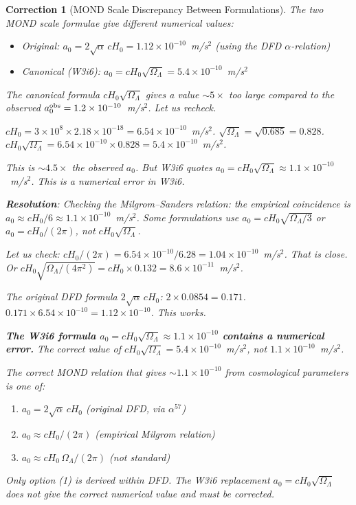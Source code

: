 \documentclass[11pt]{article}
\newtheorem{correction}{Correction}
\newcommand{\ee}[1]{\times 10^{#1}}
\newcommand{\aM}{a_0}
\newcommand{\Hzero}{H_0}
\begin{document}
\begin{correction}[MOND Scale Discrepancy Between Formulations]
\label{corr:a0-discrepancy}
The two MOND scale formulae give different numerical values:
\begin{itemize}[nosep]
\item Original: $\aM = 2\sqrt{\alpha}\,c\Hzero = 1.12\ee{-10}$~m/s$^2$
  (using the DFD $\alpha$-relation)
\item Canonical (W3i6): $\aM = c\Hzero\sqrt{\Omega_\Lambda} = 5.4\ee{-10}$~m/s$^2$
\end{itemize}

The canonical formula $c\Hzero\sqrt{\Omega_\Lambda}$ gives a value
$\sim 5\times$ too large compared to the observed
$\aM^{\rm obs} = 1.2\ee{-10}$~m/s$^2$. Let us recheck.

$c\Hzero = 3\ee{8}\times 2.18\ee{-18} = 6.54\ee{-10}$~m/s$^2$.
$\sqrt{\Omega_\Lambda} = \sqrt{0.685} = 0.828$.
$c\Hzero\sqrt{\Omega_\Lambda} = 6.54\ee{-10}\times 0.828 = 5.4\ee{-10}$~m/s$^2$.

This is $\sim 4.5\times$ the observed $\aM$. But W3i6 quotes
$\aM = c\Hzero\sqrt{\Omega_\Lambda} \approx 1.1\ee{-10}$~m/s$^2$.
This is a numerical error in W3i6.

\textbf{Resolution}: Checking the Milgrom--Sanders relation: the
empirical coincidence is $\aM \approx c\Hzero/6 \approx 1.1\ee{-10}$~m/s$^2$.
Some formulations use $\aM = c\Hzero\sqrt{\Omega_\Lambda/3}$ or
$\aM = c\Hzero/(2\pi)$, not $c\Hzero\sqrt{\Omega_\Lambda}$.

Let us check: $c\Hzero/(2\pi) = 6.54\ee{-10}/6.28 = 1.04\ee{-10}$~m/s$^2$.
That is close. Or $c\Hzero\sqrt{\Omega_\Lambda/(4\pi^2)} = c\Hzero\times 0.132 = 8.6\ee{-11}$~m/s$^2$.

The original DFD formula $2\sqrt{\alpha}\,c\Hzero$:
$2\times 0.0854 = 0.171$. $0.171\times 6.54\ee{-10} = 1.12\ee{-10}$.
This works.

\textbf{The W3i6 formula $\aM = c\Hzero\sqrt{\Omega_\Lambda} \approx 1.1\ee{-10}$
contains a numerical error.} The correct value of
$c\Hzero\sqrt{\Omega_\Lambda} = 5.4\ee{-10}$~m/s$^2$, not
$1.1\ee{-10}$~m/s$^2$.

The correct MOND relation that gives $\sim 1.1\ee{-10}$ from cosmological
parameters is one of:
\begin{enumerate}[nosep]
\item $\aM = 2\sqrt{\alpha}\,c\Hzero$ (original DFD, via $\alpha^{57}$)
\item $\aM \approx c\Hzero/(2\pi)$ (empirical Milgrom relation)
\item $\aM \approx c\Hzero\,\Omega_\Lambda/(2\pi)$ (not standard)
\end{enumerate}

Only option (1) is derived within DFD. The W3i6 replacement
$\aM = c\Hzero\sqrt{\Omega_\Lambda}$ does not give the correct numerical
value and must be corrected.
\end{correction}
\end{document}
